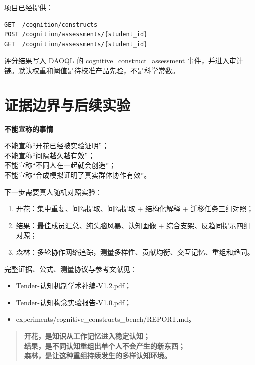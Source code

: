 \documentclass[UTF8,a4paper,11pt]{ctexart}
\newenvironment{explainbox}[1]
{\begin{center}\begin{minipage}{0.94\textwidth}\colorbox{boxbg}{\parbox{0.92\textwidth}{\textbf{#1}\par\vspace{2pt}}}}
{\end{minipage}\end{center}}
\begin{document}
项目已经提供：

\begin{verbatim}
GET  /cognition/constructs
POST /cognition/assessments/{student_id}
GET  /cognition/assessments/{student_id}
\end{verbatim}

评分结果写入 DAOQL 的 cognitive\_construct\_assessment 事件，并进入审计链。默认权重和阈值是待校准产品先验，不是科学常数。

\section{证据边界与后续实验}

\begin{explainbox}{不能宣称的事情}
不能宣称“开花已经被实验证明”；\\
不能宣称“间隔越久越有效”；\\
不能宣称“不同人在一起就会创造”；\\
不能宣称“合成模拟证明了真实群体协作有效”。
\end{explainbox}

下一步需要真人随机对照实验：

\begin{enumerate}[leftmargin=2em]
\item 开花：集中重复、间隔提取、间隔提取 + 结构化解释 + 迁移任务三组对照；
\item 结果：最佳成员汇总、纯头脑风暴、认知画像 + 综合支架、反趋同提示四组对照；
\item 森林：多轮协作网络追踪，测量多样性、贡献均衡、交互记忆、重组和趋同。
\end{enumerate}

完整证据、公式、测量协议与参考文献见：

\begin{itemize}[leftmargin=2em]
\item Tender-认知机制学术补编-V1.2.pdf；
\item Tender-认知构念实验报告-V1.0.pdf；
\item experiments/cognitive\_constructs\_bench/REPORT.md。
\end{itemize}

\begin{quote}
\large
\textbf{开花，是知识从工作记忆进入稳定认知；}\\
\textbf{结果，是不同认知重组出单个人不会产生的新东西；}\\
\textbf{森林，是让这种重组持续发生的多样认知环境。}
\end{quote}
\end{document}
